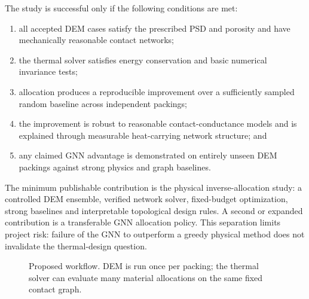 \documentclass[12pt,a4paper]{article}
\begin{document}
The study is successful only if the following conditions are met:
\begin{enumerate}
    \item all accepted DEM cases satisfy the prescribed PSD and porosity and
    have mechanically reasonable contact networks;
    \item the thermal solver satisfies energy conservation and basic numerical
    invariance tests;
    \item allocation produces a reproducible improvement over a sufficiently
    sampled random baseline across independent packings;
    \item the improvement is robust to reasonable contact-conductance models
    and is explained through measurable heat-carrying network structure; and
    \item any claimed GNN advantage is demonstrated on entirely unseen DEM
    packings against strong physics and graph baselines.
\end{enumerate}

The minimum publishable contribution is the physical inverse-allocation study:
a controlled DEM ensemble, verified network solver, fixed-budget optimization,
strong baselines and interpretable topological design rules. A second or
expanded contribution is a transferable GNN allocation policy. This separation
limits project risk: failure of the GNN to outperform a greedy physical method
does not invalidate the thermal-design question.

\begin{figure}[!htbp]
\centering
{}
\caption{Proposed workflow. DEM is run once per packing; the thermal solver can
evaluate many material allocations on the same fixed contact graph.}
\end{figure}
\end{document}
